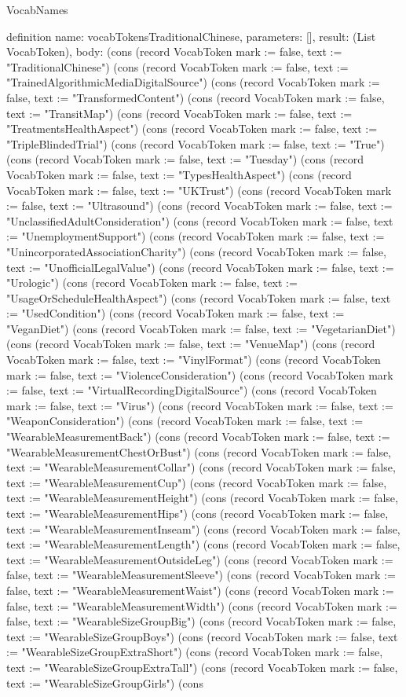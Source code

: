\begin{lexlean}{VocabNames}
\begin{semanticmodule}
definition{
  name: vocabTokensTraditionalChinese,
  parameters: [],
  result: (List VocabToken),
  body: (cons (record VocabToken {mark := false, text := "TraditionalChinese"}) (cons (record VocabToken {mark := false, text := "TrainedAlgorithmicMediaDigitalSource"}) (cons (record VocabToken {mark := false, text := "TransformedContent"}) (cons (record VocabToken {mark := false, text := "TransitMap"}) (cons (record VocabToken {mark := false, text := "TreatmentsHealthAspect"}) (cons (record VocabToken {mark := false, text := "TripleBlindedTrial"}) (cons (record VocabToken {mark := false, text := "True"}) (cons (record VocabToken {mark := false, text := "Tuesday"}) (cons (record VocabToken {mark := false, text := "TypesHealthAspect"}) (cons (record VocabToken {mark := false, text := "UKTrust"}) (cons (record VocabToken {mark := false, text := "Ultrasound"}) (cons (record VocabToken {mark := false, text := "UnclassifiedAdultConsideration"}) (cons (record VocabToken {mark := false, text := "UnemploymentSupport"}) (cons (record VocabToken {mark := false, text := "UnincorporatedAssociationCharity"}) (cons (record VocabToken {mark := false, text := "UnofficialLegalValue"}) (cons (record VocabToken {mark := false, text := "Urologic"}) (cons (record VocabToken {mark := false, text := "UsageOrScheduleHealthAspect"}) (cons (record VocabToken {mark := false, text := "UsedCondition"}) (cons (record VocabToken {mark := false, text := "VeganDiet"}) (cons (record VocabToken {mark := false, text := "VegetarianDiet"}) (cons (record VocabToken {mark := false, text := "VenueMap"}) (cons (record VocabToken {mark := false, text := "VinylFormat"}) (cons (record VocabToken {mark := false, text := "ViolenceConsideration"}) (cons (record VocabToken {mark := false, text := "VirtualRecordingDigitalSource"}) (cons (record VocabToken {mark := false, text := "Virus"}) (cons (record VocabToken {mark := false, text := "WeaponConsideration"}) (cons (record VocabToken {mark := false, text := "WearableMeasurementBack"}) (cons (record VocabToken {mark := false, text := "WearableMeasurementChestOrBust"}) (cons (record VocabToken {mark := false, text := "WearableMeasurementCollar"}) (cons (record VocabToken {mark := false, text := "WearableMeasurementCup"}) (cons (record VocabToken {mark := false, text := "WearableMeasurementHeight"}) (cons (record VocabToken {mark := false, text := "WearableMeasurementHips"}) (cons (record VocabToken {mark := false, text := "WearableMeasurementInseam"}) (cons (record VocabToken {mark := false, text := "WearableMeasurementLength"}) (cons (record VocabToken {mark := false, text := "WearableMeasurementOutsideLeg"}) (cons (record VocabToken {mark := false, text := "WearableMeasurementSleeve"}) (cons (record VocabToken {mark := false, text := "WearableMeasurementWaist"}) (cons (record VocabToken {mark := false, text := "WearableMeasurementWidth"}) (cons (record VocabToken {mark := false, text := "WearableSizeGroupBig"}) (cons (record VocabToken {mark := false, text := "WearableSizeGroupBoys"}) (cons (record VocabToken {mark := false, text := "WearableSizeGroupExtraShort"}) (cons (record VocabToken {mark := false, text := "WearableSizeGroupExtraTall"}) (cons (record VocabToken {mark := false, text := "WearableSizeGroupGirls"}) (cons }
\end{semanticmodule}
\end{lexlean}
